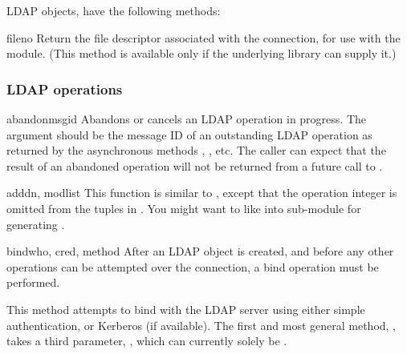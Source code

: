 LDAP objects, have the following methods:


\begin{methoddesc}{fileno}{}
Return the file descriptor associated with the connection, for use
with the  module.
(This method is available only if the underlying library can supply it.)
\end{methoddesc}

\subsubsection{LDAP operations}


\begin{methoddesc}[LDAP]{abandon}{msgid}
Abandons or cancels an LDAP operation in progress. The  argument
should be the message ID of an outstanding LDAP operation as returned by
the asynchronous methods , , etc. 
The caller can expect that the result
of an abandoned operation will not be returned from a future call to 
.
\end{methoddesc}


\begin{methoddesc}[LDAP]{add}{dn, modlist} %
This function is similar to , except that the operation
integer is omitted from the tuples in .
You might want to like into sub-module  for
generating .
\end{methoddesc}


\begin{methoddesc}[LDAP]{bind}{who, cred, method} %
After an LDAP object is created, and before any other operations can be
attempted over the connection, a bind operation must be performed.

This method attempts to bind with the LDAP server using 
either simple authentication, or Kerberos (if available).
The first and most general method, ,
takes a third parameter, , which can currently solely
be .
\end{methoddesc}

